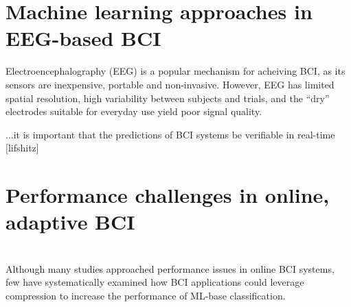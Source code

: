 
\section{Machine learning approaches in EEG-based BCI}
Electroencephalography (EEG) is a popular mechanism for acheiving BCI, as its sensors are inexpensive, portable and non-invasive. However, EEG has limited spatial resolution, high variability between subjects and trials, and the ``dry'' electrodes suitable for everyday use yield poor signal quality. 

...it is important that the predictions of BCI systems be verifiable in real-time [lifshitz]

\section{Performance challenges in online, adaptive BCI}

\section{}
Although many studies approached performance issues in online BCI systems,  few have systematically examined how BCI applications could leverage compression to increase the performance of ML-base classification.